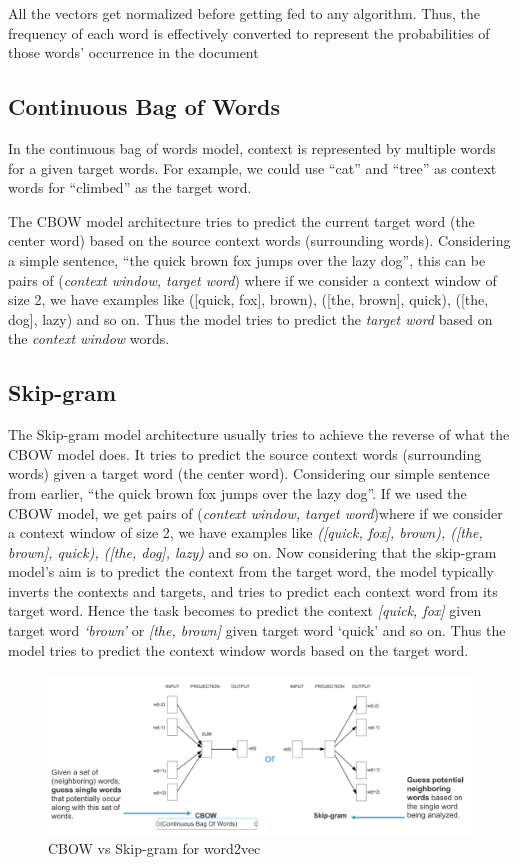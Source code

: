 All the vectors get normalized before getting fed to any algorithm. Thus, the frequency of each word is effectively converted to represent the probabilities of those words’ occurrence in the document


\subsection{Continuous Bag of Words}
 
 In the continuous bag of words model, context is represented by multiple words for a given target words. For example, we could use “cat” and “tree” as context words for “climbed” as the target word.
 
 The CBOW model architecture tries to predict the current target word (the center word) based on the source context words (surrounding words). Considering a simple sentence, “the quick brown fox jumps over the lazy dog”, this can be pairs of (\textit{context window, target word}) where if we consider a context window of size 2, we have examples like ([quick, fox], brown), ([the, brown], quick), ([the, dog], lazy) and so on. Thus the model tries to predict the \textit{target word} based on the \textit{context window} words.
 

\subsection{Skip-gram}

The Skip-gram model architecture usually tries to achieve the reverse of what the CBOW model does. It tries to predict the source context words (surrounding words) given a target word (the center word). Considering our simple sentence from earlier, “the quick brown fox jumps over the lazy dog”. If we used the CBOW model, we get pairs of (\textit{context window, target word})where if we consider a context window of size 2, we have examples like \textit{([quick, fox], brown), ([the, brown], quick), ([the, dog], lazy)} and so on. Now considering that the skip-gram model’s aim is to predict the context from the target word, the model typically inverts the contexts and targets, and tries to predict each context word from its target word. Hence the task becomes to predict the context \textit{[quick, fox]} given target word \textit{‘brown’} or \textit{[the, brown]} given target word ‘quick’ and so on. Thus the model tries to predict the context window words based on the target word.


\begin{figure}[ht]
    \centering
    \includegraphics[scale=0.3]{Images/cbow-sg.png}
    \caption{CBOW vs Skip-gram for word2vec}
    \label{fig:cbowsg}
\end{figure}



